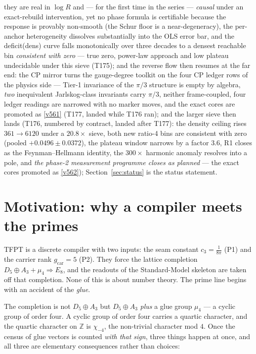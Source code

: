 \documentclass[11pt,a4paper]{article}
\newcommand{\cthree}{c_3}
\newcommand{\gcar}{g_{\mathrm{car}}}
\newcommand{\Z}{\mathbb Z}
\begin{document}
they are real in $\log R$ and --- for the first time in the series --- \emph{causal} under an
exact-rebuild intervention, yet no phase formula is certifiable because the response is
provably non-smooth (the Schur floor is a near-degeneracy), the per-anchor heterogeneity
dissolves substantially into the OLS error bar, and the deficit(dens) curve falls monotonically
over three decades to a densest reachable bin \emph{consistent with zero} --- true zero,
power-law approach and low plateau undecidable under this sieve (T175); and the reverse
flow then resumes at the far end: the CP mirror turns the gauge-degree toolkit on the four
CP ledger rows of the physics side --- Tier-1 invariance of the $\pi/3$ structure is empty
by algebra, \emph{two} inequivalent Jarlskog-class invariants carry $\pi/3$, neither
frame-coupled, four ledger readings are narrowed with no marker moves, and the exact cores
are promoted as \vref{v561} (T177, landed while T176 ran); and the larger sieve then
lands (T176, numbered by contract, landed after T177): the density ceiling rises
$361\to6120$ under a $20.8\times$ sieve, both new ratio-4 bins are consistent with zero
(pooled $+0.0496\pm0.0372$), the plateau window narrows by a factor $3.6$, R1 closes as
the Feynman--Hellmann identity, the $300\times$ harmonic anomaly resolves into a pole,
and \emph{the phase-2 measurement programme closes as planned} --- the exact cores
promoted as \vref{v562});
Section~\ref{sec:status} is the status statement.

\section{Motivation: why a compiler meets the primes}\label{sec:motivation}
TFPT is a discrete compiler with two inputs: the seam constant $\cthree=\tfrac1{8\pi}$ (P1) and the
carrier rank $\gcar=5$ (P2). They force the lattice completion $D_5\oplus A_3+\mu_4\Rightarrow E_8$,
and the readouts of the Standard-Model skeleton are taken off that completion. None of this is about
number theory. The prime line begins with an accident of the \emph{glue}.

The completion is not $D_5\oplus A_3$ but $D_5\oplus A_3$ \emph{plus} a glue group $\mu_4$ --- a cyclic
group of order four. A cyclic group of order four carries a quartic character, and the quartic
character on $\Z$ is $\chi_{-4}$, the non-trivial character mod $4$. Once the census of glue vectors is
counted \emph{with that sign}, three things happen at once, and all three are elementary consequences
rather than choices:
\end{document}
